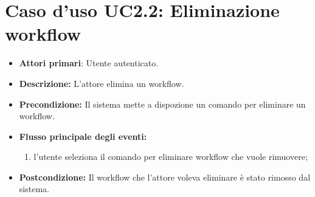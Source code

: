 		\section{Caso d'uso UC2.2: Eliminazione workflow}
		\begin{itemize}
			\item \textbf{Attori primari}: Utente autenticato.
			\item \textbf{Descrizione:} L'attore elimina un workflow.
			\item \textbf{Precondizione:} Il sistema mette a dispozione un comando per eliminare un workflow.
			\item \textbf{Flusso principale degli eventi:}
			\begin{enumerate}
				\item l'utente seleziona il comando per eliminare workflow che vuole rimuovere;
			\end{enumerate}
			\item \textbf{Postcondizione:} Il workflow che l'attore voleva eliminare è stato rimosso dal sistema.
		\end{itemize}
